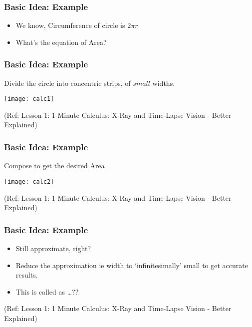  \begin{frame}[fragile]\frametitle{Basic Idea: Example}
\begin{itemize}
\item We know, Circumference of circle is $2\pi r$
\item What's the equation of Area?
\end{itemize}
\end{frame}

 \begin{frame}[fragile]\frametitle{Basic Idea: Example}
Divide the circle into concentric strips, of $small$ widths.

\begin{center}
\texttt{[image: calc1]}
\end{center}

\tiny{(Ref: Lesson 1: 1 Minute Calculus: X-Ray and Time-Lapse Vision - Better Explained)}
\end{frame}

 \begin{frame}[fragile]\frametitle{Basic Idea: Example}
Compose to get the desired Area
\begin{center}
\texttt{[image: calc2]}
\end{center}

\tiny{(Ref: Lesson 1: 1 Minute Calculus: X-Ray and Time-Lapse Vision - Better Explained)}
\end{frame}

 \begin{frame}[fragile]\frametitle{Basic Idea: Example}

\begin{itemize}
\item Still approximate, right?
\item Reduce the approximation ie width to `infinitesimally' small to get accurate results.
\item This is called as \ldots ??
\end{itemize}

\tiny{(Ref: Lesson 1: 1 Minute Calculus: X-Ray and Time-Lapse Vision - Better Explained)}
\end{frame}


